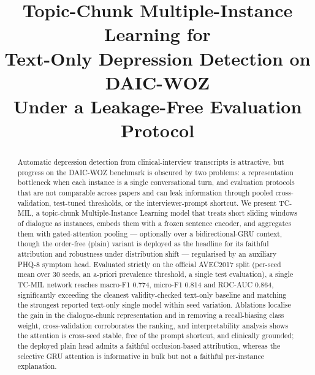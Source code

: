 \documentclass[conference]{IEEEtran}
\begin{document}
\raggedbottom  %

\title{Topic-Chunk Multiple-Instance Learning for\\Text-Only Depression
Detection on DAIC-WOZ\\Under a Leakage-Free Evaluation Protocol}

\author{
\and
{}
}

\maketitle

\begin{abstract}
Automatic depression detection from clinical-interview transcripts is
attractive, but progress on the DAIC-WOZ benchmark is obscured by two problems:
a representation bottleneck when each instance is a single conversational turn,
and evaluation protocols that are not comparable across papers and can
leak information through pooled cross-validation, test-tuned thresholds, or the
interviewer-prompt shortcut. We present TC-MIL, a topic-chunk Multiple-Instance
Learning model that treats short sliding windows of dialogue as instances,
embeds them with a frozen sentence encoder, and aggregates them with
gated-attention pooling --- optionally over a bidirectional-GRU context, though
the order-free (plain) variant is deployed as the headline for its faithful
attribution and robustness under distribution shift --- regularised by an
auxiliary PHQ-8 symptom head. Evaluated strictly on the official AVEC2017 split (per-seed mean
over 30 seeds, an a-priori prevalence threshold, a single test evaluation), a
single TC-MIL network reaches macro-F1 0.774, micro-F1 0.814 and ROC-AUC 0.864,
significantly exceeding the cleanest validity-checked text-only baseline and
matching the strongest reported text-only single model within seed variation. Ablations localise the gain in the dialogue-chunk
representation and in removing a recall-biasing class weight, cross-validation
corroborates the ranking, and interpretability analysis shows the attention is
cross-seed stable, free of the prompt shortcut, and clinically grounded; the
deployed plain head admits a faithful occlusion-based attribution, whereas the
selective GRU attention is informative in bulk but not a faithful per-instance
explanation.
\end{abstract}
\end{document}

